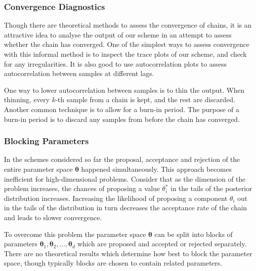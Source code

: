\subsubsection*{Convergence Diagnostics}
\label{sssec:convergence_diagnostics}
Though there are theoretical methods to assess the convergence of chains, it is an attractive idea to analyse the output of our scheme in an attempt to assess whether the chain has converged. One of the simplest ways to assess convergence with this informal method is to inspect the trace plots of our scheme, and check for any irregularities. It is also good to use autocorrelation plots to assess autocorrelation between samples at different lags.

One way to lower autocorrelation between samples is to thin the output. When thinning, every $k$-th sample from a chain is kept, and the rest are discarded. Another common technique is to allow for a burn-in period. The purpose of a burn-in period is to discard any samples from before the chain has converged.

\subsubsection*{Blocking Parameters}
\label{sssec:blocking_parameters}
In the schemes considered so far the proposal, acceptance and rejection of the entire parameter space $\bm{\theta}$ happened simultaneously. This approach becomes inefficient for high-dimensional problems. Consider that as the dimension of the problem increases, the chances of proposing a value $\theta_i^*$ in the tails of the posterior distribution increases. Increasing the likelihood of proposing a component $\theta_i$ out in the tails of the distribution in turn decreases the acceptance rate of the chain and leads to slower convergence.

To overcome this problem the parameter space $\bm{\theta}$ can be split into blocks of parameters $\bm{\theta}_1, \bm{\theta}_2, \dots, \bm{\theta}_d$ which are proposed and accepted or rejected separately. There are no theoretical results which determine how best to block the parameter space, though typically blocks are chosen to contain related parameters.